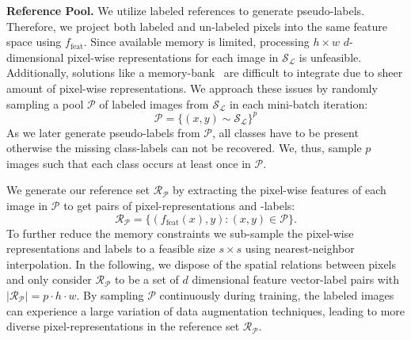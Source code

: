 \documentclass[letterpaper]{article} %
\begin{document}
\noindent\textbf{Reference Pool.}
We utilize labeled references to generate pseudo-labels. Therefore, we project both labeled and un-labeled pixels into the same feature space using $f_{\text{feat}}$.
Since available memory is limited, processing $h \times w$ $d$-dimensional pixel-wise representations for each image in $\mathcal{S_L}$ is unfeasible. Additionally, solutions like a memory-bank~\cite{wu2018unsupervised} are difficult to integrate due to sheer amount of pixel-wise representations.
We approach these issues by randomly sampling a pool $\mathcal{P}$ of labeled images from $\mathcal{S_L}$ in each mini-batch iteration:
\begin{equation}
 \mathcal{P}=\{(x,y) \sim \mathcal{S_L}\}^p %
\end{equation}
As we later generate pseudo-labels from $\mathcal{P}$, all classes have to be present otherwise the missing class-labels can not be recovered.
We, thus, sample $p$ images such that each class occurs at least once in $\mathcal{P}$.

We generate our reference set $\mathcal{R}_{\mathcal{P}}$ by extracting the pixel-wise features of each image in $ \mathcal{P}$ to get pairs of pixel-representations and -labels:
\begin{equation}\mathcal{R}_{\mathcal{P}}=\{(f_\text{feat}(x),y): (x,y) \in \mathcal{P}\}.\end{equation}
To further reduce the memory constraints we sub-sample the pixel-wise representations and labels to a feasible size $s \times s$ using nearest-neighbor interpolation.
In the following, we dispose of the spatial relations between pixels and only consider $\mathcal{R}_{\mathcal{P}}$ to be a set of $d$ dimensional feature vector-label pairs with $|\mathcal{R}_{\mathcal{P}}| = p\cdot h\cdot w$.
 By sampling $\mathcal{P}$ continuously during training, the labeled images can experience a large variation of data augmentation techniques, leading to more diverse pixel-representations in the reference set $\mathcal{R}_{\mathcal{P}}$.
\end{document}
